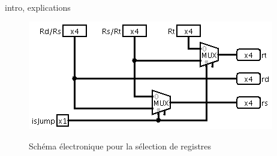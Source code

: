 \paragraph{}{
	intro, explications
}

\begin{figure}
	\centering
	\includegraphics[scale=0.8,origin=c]{circuits/selec_reg.png}
	\label{selec_reg_circ}
	\caption{Sch\'{e}ma \'{e}lectronique pour la s\'{e}lection de registres}
\end{figure}